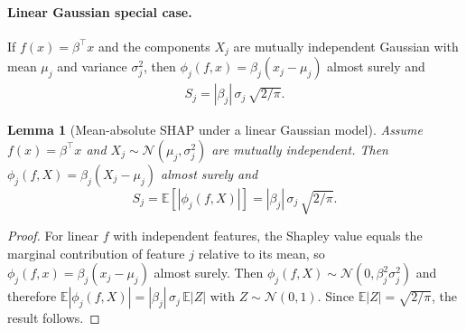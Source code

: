 \documentclass[pdflatex,sn-mathphys-num]{sn-jnl}%
\def\EQSP{3pt}
\newcommand{\cgather}[2][\EQSP]{\begingroup\setlength\abovedisplayskip{#1}\setlength\belowdisplayskip{#1}\begin{gather} #2 \end{gather}\endgroup\noindent}
\theoremstyle{thmstyleone}%
\newtheorem{lemma}[theorem]{Lemma} %
\theoremstyle{thmstyletwo}%
\theoremstyle{thmstylethree}%
\begin{document}
\paragraph{Linear Gaussian special case.}
If $f(x)=\beta^{\top}x$ and the components $X_{j}$ are mutually independent Gaussian with mean $\mu_{j}$ and variance $\sigma_{j}^{2}$,
then $\phi_{j}(f,x)=\beta_{j}(x_{j}-\mu_{j})$ almost surely and
\cgather{
S_{j} = |\beta_{j}|\,\sigma_{j}\,\sqrt{2/\pi}.
\label{SHAP-MA-Lin}
}

\begin{lemma}[Mean-absolute SHAP under a linear Gaussian model]\label{lem:shap_lin_gauss}
Assume $f(x)=\beta^\top x$ and $X_j \sim \mathcal N(\mu_j,\sigma_j^2)$ are mutually independent.
Then $\phi_j(f,X)=\beta_j(X_j-\mu_j)$ almost surely and
\[
S_j = \mathbb E\!\left[|\phi_j(f,X)|\right]
=|\beta_j|\,\sigma_j\,\sqrt{2/\pi}.
\]
\end{lemma}

\begin{proof}
For linear $f$ with independent features, the Shapley value equals the marginal contribution of feature $j$ relative to its mean,
so $\phi_j(f,x)=\beta_j(x_j-\mu_j)$ almost surely.
Then $\phi_j(f,X)\sim \mathcal N(0,\beta_j^2\sigma_j^2)$ and therefore
$\mathbb E|\phi_j(f,X)| = |\beta_j|\,\sigma_j\,\mathbb E|Z|$ with $Z\sim\mathcal N(0,1)$.
Since $\mathbb E|Z|=\sqrt{2/\pi}$, the result follows.
\end{proof}
\end{document}
